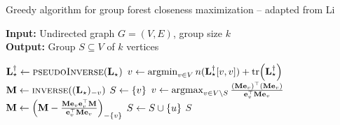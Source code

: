 \begin{algorithm}[t]
\footnotesize
{}
\caption{\footnotesize Greedy algorithm for group forest closeness maximization -- adapted from Li \etal~\cite{DBLP:conf/www/0002PSYZ19}}
\label{algo:group-forest-closeness}
\textbf{Input:} Undirected graph $G = (V, E)$, group size $k$ \\
\textbf{Output:} Group $S \subseteq V$ of $k$ vertices

\begin{algorithmic}[1]
\State$\mathbf{L}^\dagger_\star \gets\textsc{pseudoInverse}(\mathbf{L_{\star}})$
\State$v \gets \argmin_{v \in V}n(\Linvstar[v, v]) + \tr{\Linvstar}$
\State$\mathbf{M} \gets \textsc{inverse}((\mathbf{L_{\star}})_{-v})$
\State$S \gets \set{v}$
\State$v \gets \operatorname*{argmax}_{v \in V \setminus S}
\frac{(\mathbf{M}\mathbf{e}_{v})^\top(\mathbf{M}\mathbf{e}_{v})}{\mathbf{e}_{v}^\top\mathbf{M}\mathbf{e}_{v}}$
\State$\mat{M} \gets
\roundb{\mat{M} - \frac{\mat{M}\cunit{v}\cunit{v}^\top\mat{M}}{\cunit{v}^\top\mat{M}\cunit{v}}}_{-\set{v}}$
\label{line:gfc:m-update}
\State$S \gets S \cup \set{u}$
\EndWhile
\State\Return$S$
\end{algorithmic}

\end{algorithm}

